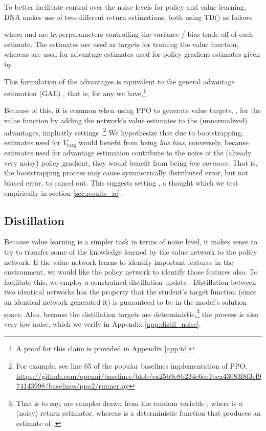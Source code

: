 \documentclass{article}
\newcommand{\vt}[0]{\ensuremath{V_\text{targ}}\xspace}
\begin{document}
To better facilitate control over the noise levels for policy and value learning, DNA makes use of two different return estimations, both using TD() \cite{sutton1988learning} as follows


where  and  are hyperparameters controlling the variance / bias trade-off of each estimate. The  estimates are used as targets for training the value function, whereas  are used for advantage estimates used for policy gradient estimates given by





This formulation of the advantages is equivalent to the general advantage estimation (GAE) \cite{schulman2015high}, that is, for any   we have,\footnote{A proof for this claim is provided in Appendix \ref{app:td}}

Because of this, it is common when using PPO to generate value targets, , for the value function by adding the network's value estimates to the (unnormalized) advantages, implicitly settings .\footnote{For example, see line 65 of the popular baselines implementation of PPO. \url{https://github.com/openai/baselines/blob/ea25b9e8b234e6ee1bca43083f8f3cf974143998/baselines/ppo2/runner.py} } We hypothesize that due to bootstrapping, estimates used for \vt would benefit from being \textit{low bias}, conversely, because estimates used for advantage estimation contribute to the noise of the (already very noisy) policy gradient, they would benefit from being \textit{low variance}. That is, the bootstrapping process may cause symmetrically distributed error, but not biased error, to cancel out. This suggests setting , a thought which we test empirically in section \ref{sec:results_re}.

\subsection{Distillation}
\label{sec:distillation}

Because value learning is a simpler task in terms of noise level, it makes sense to try to transfer some of the knowledge learned by the value network to the policy network. If the value network learns to identify important features in the environment, we would like the policy network to identify those features also. To facilitate this, we employ a constrained distillation update \cite{hinton2015distilling}. Distillation between two identical networks has the property that the student's target function (since an identical network generated it) is guaranteed to be in the model's solution space. Also, because the distillation targets are deterministic,\footnote{That is to say,  are samples drawn from the random variable , where  is a (noisy) return estimator, whereas  is a deterministic function that produces an estimate of .} the process is also very low noise, which we verify in Appendix \ref{app:distil_noise}.
\end{document}
